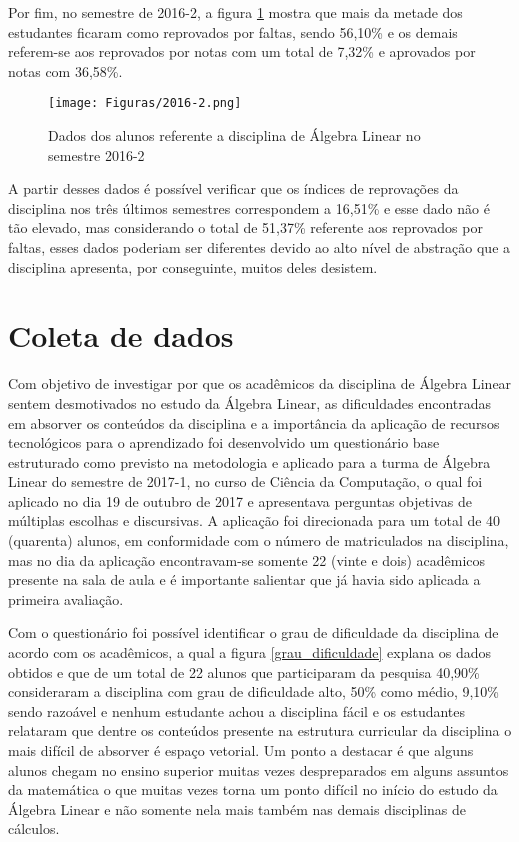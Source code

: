 Por fim, no semestre de 2016-2, a figura \ref{algebra_linear_2016_2} mostra que mais da metade dos estudantes ficaram como reprovados por faltas, sendo 56,10\% e os demais referem-se aos reprovados por notas com um total de 7,32\% e aprovados por notas com 36,58\%.

\begin{figure}[!htb]
  \centering 
  \texttt{[image: Figuras/2016-2.png]}
  \caption{Dados dos alunos referente a disciplina de Álgebra Linear no semestre 2016-2}\label{algebra_linear_2016_2}
\end{figure}

A partir desses dados é possível verificar que os índices de reprovações da disciplina nos três últimos semestres correspondem a 16,51\% e esse dado não é tão elevado, mas considerando o total de 51,37\% referente aos reprovados por faltas, esses dados poderiam ser diferentes devido ao alto nível de abstração que a disciplina apresenta, por conseguinte, muitos deles desistem.

\section{Coleta de dados}
\label{coleta_dados}

\noindent Com objetivo de investigar por que os acadêmicos da disciplina de Álgebra Linear sentem desmotivados no estudo da Álgebra Linear, as dificuldades encontradas em absorver os conteúdos da disciplina e a importância da aplicação de recursos tecnológicos para o aprendizado foi desenvolvido um questionário base estruturado como previsto na metodologia e aplicado para a turma de Álgebra Linear do semestre de 2017-1, no curso de Ciência da Computação, o qual foi aplicado no dia 19 de outubro de 2017 e apresentava perguntas objetivas de múltiplas escolhas e discursivas. A aplicação foi direcionada para um total de 40 (quarenta) alunos, em conformidade com o número de matriculados na disciplina, mas no dia da aplicação encontravam-se somente 22 (vinte e dois) acadêmicos presente na sala de aula e é importante salientar que já havia sido aplicada a primeira avaliação.  

Com o questionário foi possível identificar o grau de dificuldade da disciplina de acordo com os acadêmicos, a qual a figura \ref{grau_dificuldade} explana os dados obtidos e que de um total de 22 alunos que participaram da pesquisa 40,90\% consideraram a disciplina com grau de dificuldade alto, 50\% como médio, 9,10\% sendo razoável e nenhum estudante achou a disciplina fácil e os estudantes relataram que dentre os conteúdos presente na estrutura curricular da disciplina o mais difícil de absorver é espaço vetorial. Um ponto a destacar é que alguns alunos chegam no ensino superior muitas vezes despreparados em alguns assuntos da matemática o que muitas vezes torna um ponto difícil no início do estudo da Álgebra Linear e não somente nela mais também nas demais disciplinas de cálculos.

